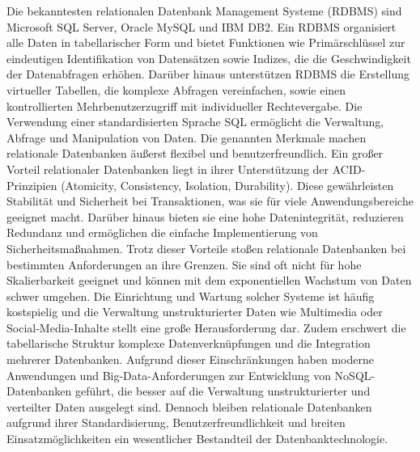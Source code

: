 \newpage \noindent
Die bekanntesten relationalen Datenbank Management Systeme (RDBMS) sind Microsoft SQL Server, Oracle MySQL und IBM DB2. Ein RDBMS organisiert alle Daten in tabellarischer Form und bietet Funktionen wie Primärschlüssel zur eindeutigen Identifikation von Datensätzen sowie Indizes, die die Geschwindigkeit der Datenabfragen erhöhen. Darüber hinaus unterstützen RDBMS die Erstellung virtueller Tabellen, die komplexe Abfragen vereinfachen, sowie einen kontrollierten Mehrbenutzerzugriff mit individueller Rechtevergabe. Die Verwendung einer standardisierten Sprache SQL ermöglicht die Verwaltung, Abfrage und Manipulation von Daten. Die genannten Merkmale machen relationale Datenbanken äußerst flexibel und benutzerfreundlich. 
Ein großer Vorteil relationaler Datenbanken liegt in ihrer Unterstützung der ACID-Prinzipien (Atomicity, Consistency, Isolation, Durability). Diese gewährleisten Stabilität und Sicherheit bei Transaktionen, was sie für viele Anwendungsbereiche geeignet macht. Darüber hinaus bieten sie eine hohe Datenintegrität, reduzieren Redundanz und ermöglichen die einfache Implementierung von Sicherheitsmaßnahmen.  Trotz dieser Vorteile stoßen relationale Datenbanken bei bestimmten Anforderungen an ihre Grenzen. Sie sind oft nicht für hohe Skalierbarkeit geeignet und können mit dem exponentiellen Wachstum von Daten schwer umgehen. Die Einrichtung und Wartung solcher Systeme ist häufig kostspielig und die Verwaltung unstrukturierter Daten wie Multimedia oder Social-Media-Inhalte stellt eine große Herausforderung dar. Zudem erschwert die tabellarische Struktur komplexe Datenverknüpfungen und die Integration mehrerer Datenbanken.
Aufgrund dieser Einschränkungen haben moderne Anwendungen und Big-Data-Anforderungen zur Entwicklung von NoSQL-Datenbanken geführt, die besser auf die Verwaltung unstrukturierter und verteilter Daten ausgelegt sind. Dennoch bleiben relationale Datenbanken aufgrund ihrer Standardisierung, Benutzerfreundlichkeit und breiten Einsatzmöglichkeiten ein wesentlicher Bestandteil der Datenbanktechnologie.  \citep{relationalDatabase}  \citep{9677042}
